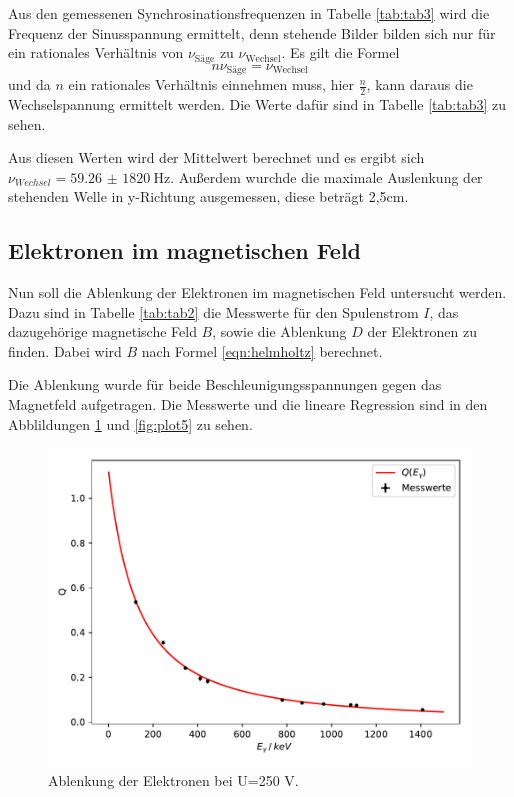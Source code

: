 Aus den gemessenen Synchrosinationsfrequenzen in Tabelle \ref{tab:tab3} wird die Frequenz der
Sinusspannung ermittelt, denn stehende Bilder bilden sich nur für ein rationales Verhältnis
von $\nu_{\text{Säge}}$ zu $\nu_{\text{Wechsel}}$.
Es gilt die Formel
\begin{equation}
  n\nu_{\text{Säge}}=\nu_{\text{Wechsel}}
\end{equation}
und da $n$ ein rationales Verhältnis einnehmen muss, hier $\frac{n}{2}$,
kann daraus die Wechselspannung ermittelt werden. Die Werte dafür sind in Tabelle
\ref{tab:tab3} zu sehen.


Aus diesen Werten wird der Mittelwert berechnet und es ergibt sich
$\nu_{Wechsel}=\SI{59,26(1820)}{\Hz}$.
Außerdem wurchde die maximale Auslenkung der stehenden Welle in y-Richtung ausgemessen, diese
beträgt 2,5\;cm.



\subsection{Elektronen im magnetischen Feld}

Nun soll die Ablenkung der Elektronen im magnetischen Feld untersucht werden.
Dazu sind in Tabelle \ref{tab:tab2} die Messwerte für den Spulenstrom $I$, das
dazugehörige magnetische Feld $B$, sowie die Ablenkung $D$ der Elektronen zu finden.
Dabei wird $B$ nach Formel \ref{eqn:helmholtz} berechnet.



Die Ablenkung wurde für beide Beschleunigungsspannungen gegen das Magnetfeld aufgetragen.
Die Messwerte und die lineare Regression sind in den Abblildungen \ref{fig:plot4} und
\ref{fig:plot5} zu sehen.

\begin{figure}
  \centering
  \includegraphics{plot4.pdf}
  \caption{Ablenkung der Elektronen bei U=250\; V.}
  \label{fig:plot4}
\end{figure}

